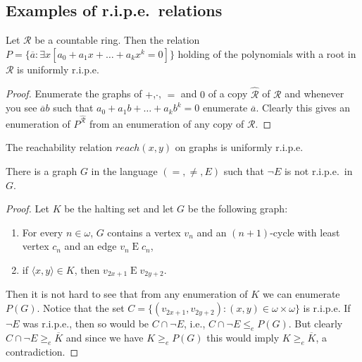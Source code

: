 \documentclass[11pt]{amsart}
\providecommand{\tightlist}{%
  \setlength{\itemsep}{0 pt}\setlength{\parskip}{0 pt}}
\newcommand{\edge}{\mathbin{E}}
\renewcommand{\bar}[1]{\overline{#1}}
\begin{document}
\subsection{Examples of r.i.p.e.\ relations}
\begin{example}
Let $\mathcal R$ be a countable ring. Then the relation 
$P=\{ \bar a: \exists x [a_0+a_1x+\dots+a_kx^k=0]\}$
holding of the polynomials with a root in $\mathcal R$ is uniformly  r.i.p.e. \end{example}
\begin{proof}
Enumerate the graphs of $+$,$\cdot$, $=$ and $0$ of a  copy $\mathcal{\hat R}$ of $\mathcal R$ and whenever you see $\bar ab$ such that $a_0+a_1b+\dots+ a_kb^k=0$ enumerate $\bar a$. Clearly this gives an enumeration of $P^\mathcal{\hat R}$ from an enumeration of any copy of $\mathcal R$.
\end{proof}
\begin{example}\label{grapheg}
The reachability relation $reach(x,y)$ on graphs is uniformly r.i.p.e.
\end{example}
\begin{proposition}
There is a graph $G$ in the language $(=,\neq,E)$ such that $\neg E$ is not r.i.p.e.\ in $G$.
\end{proposition}
\begin{proof}
Let $K$ be the halting set and let $G$ be the following graph: 
\begin{enumerate}
\tightlist
    \item For every $n\in\omega$, $G$ contains a vertex $v_n$ and an $(n+1)$-cycle with least vertex $c_n$ and  an edge $v_n\edge c_n$,
    \item if $\langle x,y\rangle\in K$, then $v_{2x+1}\edge v_{2y+2}$.
\end{enumerate}
Then it is not hard to see that from any enumeration of $K$ we can enumerate $P(G)$. Notice that the set $C=\{ (v_{2x+1},v_{2y+2}): (x,y)\in \omega\times\omega\}$ is r.i.p.e. If $\neg E$ was r.i.p.e., then so would be $C\cap \neg E$, i.e., $C\cap \neg E\leq_e P(G)$. But clearly $C\cap\neg E \geq_e \bar K$ and since we have $K\geq_e P(G)$ this would imply $K\geq_e \bar K$, a contradiction. 
\end{proof}
\end{document}
